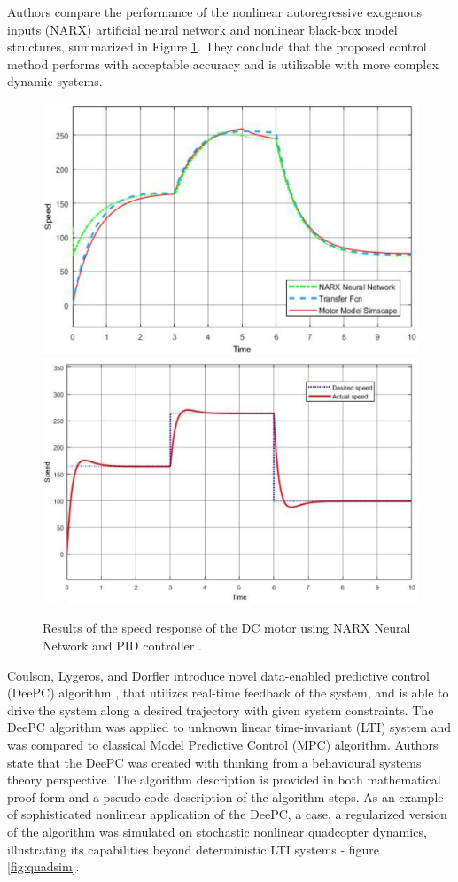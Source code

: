 \documentclass[]{final_report}
\begin{document}
Authors compare the performance of the nonlinear autoregressive exogenous inputs (NARX) artificial neural network and nonlinear black-box model structures, summarized in Figure \ref{fig:pidcomparison}. They conclude that the proposed control method performs with acceptable accuracy and is utilizable with more complex dynamic systems. 

\begin{figure}
\centerline{
\includegraphics[width=.47\textwidth]{Screenshots for related work/2.png}\hfill
\label{NARX ANN}
\includegraphics[width=.49\textwidth]{Screenshots for related work/3.png}
\label{PID controller}
}
\caption{Results of the speed response of the DC motor using NARX Neural Network and PID controller \cite{naung2018a}.}
\label{fig:pidcomparison}
\end{figure}

Coulson, Lygeros, and Dorfler introduce novel data-enabled predictive
control (DeePC) algorithm \cite{coulson2019data}, that utilizes real-time feedback of the system, and is able to drive the system along a desired trajectory with given system constraints. The DeePC  algorithm  was  applied  to unknown linear time-invariant (LTI)  system  and was compared to classical Model  Predictive  Control (MPC) algorithm. Authors state that the DeePC was created with thinking from a behavioural systems theory perspective. The algorithm description is provided in both mathematical proof form and a pseudo-code description of the algorithm steps. As an example of sophisticated nonlinear application of the DeePC, a case, a regularized version of the algorithm was simulated on  stochastic nonlinear quadcopter dynamics, illustrating its capabilities beyond deterministic LTI systems - figure \ref{fig:quadsim}.
\end{document}
